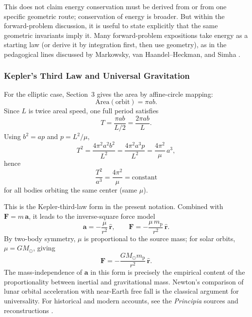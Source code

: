 This does not claim energy conservation must be derived from  or from one specific geometric route; conservation of energy is broader. But within the forward-problem discussion, it is useful to state explicitly that the same geometric invariants imply it. Many forward-problem expositions take energy as a starting law (or derive it by integration first, then use geometry), as in the pedagogical lines discussed by Markowsky, van Haandel--Heckman, and Simha \cite{markowsky2011newton,vanhaandelheckman2009teaching,simha2021algebra}.

\subsubsection{Kepler's Third Law and Universal Gravitation}

For the elliptic case, Section~3 gives the area by affine-circle mapping:
\[
  \mathrm{Area}(\text{orbit})=\pi ab.
\]
Since \(L\) is twice areal speed, one full period satisfies
\begin{equation}
  T=\frac{\pi ab}{L/2}=\frac{2\pi ab}{L}.
\label{eq:proof2f-disc-period}
\end{equation}
Using \(b^2=ap\) and \(p=L^2/\mu\),
\begin{equation}
  T^2
  =\frac{4\pi^2a^2b^2}{L^2}
  =\frac{4\pi^2a^3p}{L^2}
  =\frac{4\pi^2}{\mu}\,a^3,
\label{eq:proof2f-disc-third-law}
\end{equation}
hence
\begin{equation}
  \frac{T^2}{a^3}=\frac{4\pi^2}{\mu}=\text{constant}
\label{eq:proof2f-disc-third-law-ratio}
\end{equation}
for all bodies orbiting the same center (same \(\mu\)).

This is the Kepler-third-law form in the present notation. Combined with \( \mathbf F=m\,\mathbf a\), it leads to the inverse-square force model
\[
  \mathbf a=-\frac{\mu}{r^2}\,\hat{\mathbf r},
  \qquad
  \mathbf F=-\frac{\mu\,m_{\mathrm p}}{r^2}\,\hat{\mathbf r}.
\]
By two-body symmetry, \(\mu\) is proportional to the source mass; for solar orbits, \(\mu=G M_\odot\), giving
\[
  \mathbf F=-\frac{G M_\odot m_{\mathrm p}}{r^2}\,\hat{\mathbf r}.
\]
The mass-independence of \(\mathbf a\) in this form is precisely the empirical content of the proportionality between inertial and gravitational mass. Newton's comparison of lunar orbital acceleration with near-Earth free fall is the classical argument for universality. For historical and modern accounts, see the \emph{Principia} sources and reconstructions \cite{newton1687principia,newton1846mottewikisource,newton1934mottecajori,chandrasekhar1995principia,nauenberg2003keplerarea,markowsky2011newton}.

